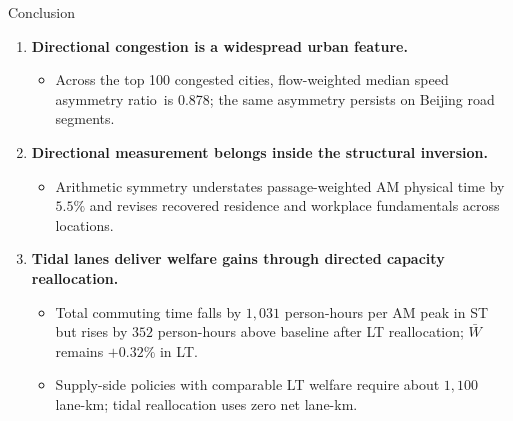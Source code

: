 \documentclass[11pt,aspectratio=169]{beamer}
\newcommand{\good}[1]{\textcolor{blue!70!black}{#1}}
\newcommand{\bad}[1]{\textcolor{red!70!black}{#1}}
\newcommand{\SAR}{speed asymmetry ratio}
\begin{document}
\begin{frame}{Conclusion}
\begin{enumerate}
  \item \textbf{Directional congestion is a widespread urban feature.}
  \begin{itemize}\footnotesize
    \item Across the top 100 congested cities, flow-weighted median \SAR\ is \good{0.878}; the same asymmetry persists on Beijing road segments.
  \end{itemize}
  \item \textbf{Directional measurement belongs inside the structural inversion.}
  \begin{itemize}\footnotesize
    \item Arithmetic symmetry understates passage-weighted AM physical time by \good{$5.5\%$} and revises recovered residence and workplace fundamentals across locations.
  \end{itemize}
  \item \textbf{Tidal lanes deliver welfare gains through directed capacity reallocation.}
  \begin{itemize}\footnotesize
    \item Total commuting time falls by \good{$1{,}031$ person-hours per AM peak} in ST but rises by \bad{$352$ person-hours} above baseline after LT reallocation; $\bar W$ remains \good{$+0.32\%$} in LT.
    \item Supply-side policies with comparable LT welfare require about \bad{$1{,}100$ lane-km}; tidal reallocation uses \good{zero net lane-km}.
  \end{itemize}
\end{enumerate}
\end{frame}

\appendix
\end{document}
